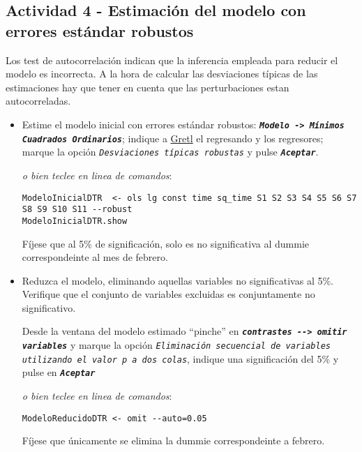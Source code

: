\documentclass[11pt]{article}
\begin{document}
\subsection{Actividad 4 - Estimación del modelo con errores estándar robustos}
\label{sec:org01bf552}

Los test de autocorrelación indican que la inferencia empleada para
reducir el modelo es incorrecta. A la hora de calcular las
desviaciones típicas de las estimaciones hay que tener en cuenta que
las perturbaciones estan autocorreladas.

\begin{itemize}
\item Estime el modelo inicial con errores estándar robustos: \textbf{\emph{\texttt{Modelo ->
  Mínimos Cuadrados Ordinarios}}}; indique a \href{https://gretl.sourceforge.net/es.html}{Gretl} el regresando y los
regresores; marque la opción \emph{\texttt{Desviaciones típicas robustas}} y
pulse \textbf{\emph{\texttt{Aceptar}}}.

{\vspace{1pt} \footnotesize \color{gray!70!black} \color{gray!70!black}
\emph{o bien teclee en linea de comandos}:
\begin{verbatim}
ModeloInicialDTR  <- ols lg const time sq_time S1 S2 S3 S4 S5 S6 S7 S8 S9 S10 S11 --robust
ModeloInicialDTR.show
\end{verbatim}
}

Fíjese que al 5\% de significación, solo es no significativa al
dummie correspondeinte al mes de febrero.

\item Reduzca el modelo, eliminando aquellas variables no significativas
al 5\%. Verifique que el conjunto de variables excluidas es
conjuntamente no significativo.

Desde la ventana del modelo estimado ``pinche'' en \textbf{\emph{\texttt{contrastes -{}->
  omitir variables}}} y marque la opción \emph{\texttt{Eliminación secuencial de
  variables utilizando el valor p a dos colas}}, indique una
significación del 5\% y pulse en \textbf{\emph{\texttt{Aceptar}}}
{\vspace{0pt} \footnotesize \color{gray!70!black}
\emph{o bien teclee en linea de comandos}:
\begin{verbatim}
ModeloReducidoDTR <- omit --auto=0.05
\end{verbatim}
}

Fíjese que únicamente se elimina la dummie correspondeinte a
febrero.
\end{itemize}
\end{document}
